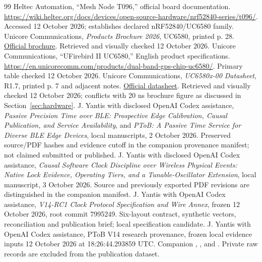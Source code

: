 \documentclass[11pt,letterpaper]{article}
\begin{document}
\begin{thebibliography}{99}
 Heltec Automation, ``Mesh Node T096,'' official board documentation. \url{https://wiki.heltec.org/docs/devices/open-source-hardware/nrf52840-series/t096/}. Accessed 12 October 2026; establishes declared nRF52840/UC6580 family.
 Unicore Communications, \emph{Products Brochure 2026}, UC6580, printed p. 28. \href{https://en.unicorecomm.com/uploads/file/Products%20Brochure%20of%20Unicore%202026_En.pdf}{Official brochure}. Retrieved and visually checked 12 October 2026.
 Unicore Communications, ``UFirebird II UC6580,'' English product specifications. \url{https://en.unicorecomm.com/products/dual-band-gps-chip-uc6580/}. Primary table checked 12 October 2026.
 Unicore Communications, \emph{UC6580x-00 Datasheet}, R1.7, printed p. 7 and adjacent notes. \href{https://en.unicorecomm.com/uploads/file/UC6580x-00_Datasheet_EN_R1.7.pdf}{Official datasheet}. Retrieved and visually checked 12 October 2026; conflicts with 20 ns brochure figure as discussed in Section~\ref{sec:hardware}.
 J. Yantis with disclosed OpenAI Codex assistance, \emph{Passive Precision Time over BLE: Prospective Edge Calibration, Causal Publication, and Service Availability}, and \emph{PToB: A Passive Time Service for Diverse BLE Edge Devices}, local manuscripts, 2 October 2026. Preserved source/PDF hashes and evidence cutoff in the companion provenance manifest; not claimed submitted or published.
 J. Yantis with disclosed OpenAI Codex assistance, \emph{Causal Software Clock Discipline over Wireless Physical Events: Native Lock Evidence, Operating Tiers, and a Tunable-Oscillator Extension}, local manuscript, 3 October 2026. Source and previously exported PDF revisions are distinguished in the companion manifest.
 J. Yantis with OpenAI Codex assistance, \emph{V14-RC1 Clock Protocol Specification and Wire Annex}, frozen 12 October 2026, root commit 7995249. Six-layout contract, synthetic vectors, reconciliation and publication brief; local specification candidate.
 J. Yantis with OpenAI Codex assistance, PToB V14 research provenance, frozen local evidence inputs 12 October 2026 at 18:26:44.293859 UTC. Companion , , and . Private raw records are excluded from the publication dataset.
\end{thebibliography}
\end{document}
